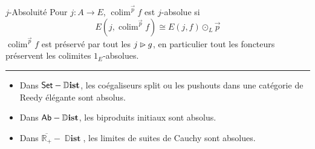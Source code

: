 \documentclass[9pt]{beamer}
\newcommand{\bb}[1]{\mathbb{#1}}
\newcommand{\cat}[1]{\textcat{#1}}
\newcommand{\textcat}[1]{{\normalfont\textsf{#1}}}
\newcommand{\plext}{\mathbin{{\rhd}\mathclap{\mspace{-17.5mu}\cdot}}}
\newcommand{\simeqq}{\cong}
\DeclareMathOperator{\Dist}{\bb{D}\textbf{ist}}
\DeclareMathOperator{\colim}{colim}
\begin{document}
\begin{frame}{$j$-Absoluité}
    Pour $j : A \to E$, $\colim^{\vec p}f$ est $j$-absolue si
    $$E(j, \colim^{\vec p}f) \simeqq E(j, f) \odot_L \vec p$$
    $\colim^{\vec p}f$ est préservé par tout les $j\plext g$, en particulier tout les foncteurs préservent les colimites $1_E$-absolues.
    \vspace{\baselineskip}
    \pause
    \hrule
    \vspace{\baselineskip}
    \begin{itemize}
        \item Dans $\cat{Set}-\Dist$, les coégaliseurs split ou les pushouts dans une catégorie de Reedy élégante sont absolus.
        \item Dans $\cat{Ab}-\Dist$, les biproduits initiaux sont absolus.
        \item Dans $\overline{\bb R_+}-\Dist$, les limites de suites de Cauchy sont absolues.
    \end{itemize}
\end{frame}
\end{document}
